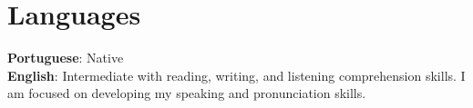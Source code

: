 \documentclass[letterpaper,11pt]{article}
\begin{document}
\section{Languages}
 \begin{itemize}[leftmargin=0.15in, label={}]
    \small{\item{
     \textbf{Portuguese}{: Native} \\
    \textbf{English}{: Intermediate with reading, writing, and listening comprehension skills. I am focused on developing my speaking and pronunciation skills. } \\

    }}
 \end{itemize}

%
\end{document}
